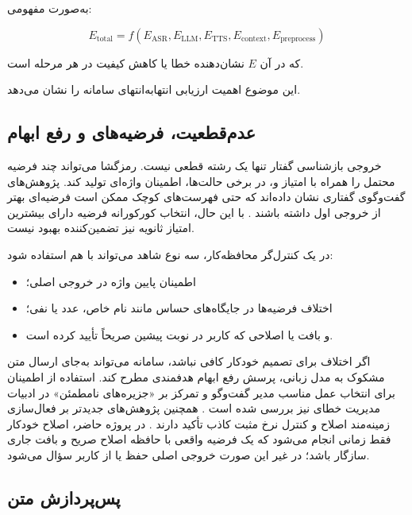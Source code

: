 به‌صورت مفهومی:

\begin{equation}
E_{\mathrm{total}}
=
f(
E_{\mathrm{ASR}},
E_{\mathrm{LLM}},
E_{\mathrm{TTS}},
E_{\mathrm{context}},
E_{\mathrm{preprocess}}
)
\end{equation}

که در آن $E$ نشان‌دهنده خطا یا کاهش کیفیت در هر مرحله است.

این موضوع اهمیت ارزیابی انتهابه‌انتهای سامانه را نشان می‌دهد.


\subsection{عدم‌قطعیت، فرضیه‌های  و رفع ابهام}

خروجی بازشناسی گفتار تنها یک رشته قطعی نیست. رمزگشا می‌تواند
چند فرضیه محتمل را همراه با امتیاز و، در برخی حالت‌ها، اطمینان
واژه‌ای تولید کند. پژوهش‌های گفت‌وگوی گفتاری نشان داده‌اند که
حتی فهرست‌های کوچک  ممکن است فرضیه‌ای بهتر از خروجی
اول داشته باشند \cite{baumann2009nbest}. با این حال، انتخاب کورکورانه
فرضیه دارای بیشترین امتیاز ثانویه نیز تضمین‌کننده بهبود نیست.

در یک کنترل‌گر محافظه‌کار، سه نوع شاهد می‌تواند با هم استفاده شود:

\begin{itemize}
    \item اطمینان پایین واژه در خروجی اصلی؛
    \item اختلاف فرضیه‌ها در جایگاه‌های حساس مانند نام خاص، عدد
    یا نفی؛
    \item و بافت یا اصلاحی که کاربر در نوبت پیشین صریحاً تأیید
    کرده است.
\end{itemize}

اگر اختلاف برای تصمیم خودکار کافی نباشد، سامانه می‌تواند به‌جای
ارسال متن مشکوک به مدل زبانی، پرسش رفع ابهام هدفمندی مطرح کند.
استفاده از اطمینان برای انتخاب عمل مناسب مدیر گفت‌وگو و تمرکز
بر «جزیره‌های نامطمئن» در ادبیات مدیریت خطای  نیز بررسی
شده است \cite{simonnet2017asrerror}. همچنین پژوهش‌های جدیدتر بر
فعال‌سازی زمینه‌مند اصلاح و کنترل نرخ مثبت کاذب تأکید دارند
\cite{asano2025contextual}. در پروژه حاضر، اصلاح خودکار فقط زمانی
انجام می‌شود که یک فرضیه واقعی  با حافظه اصلاح صریح و
بافت جاری سازگار باشد؛ در غیر این صورت خروجی اصلی حفظ یا از
کاربر سؤال می‌شود.


\subsection{پس‌پردازش متن}

